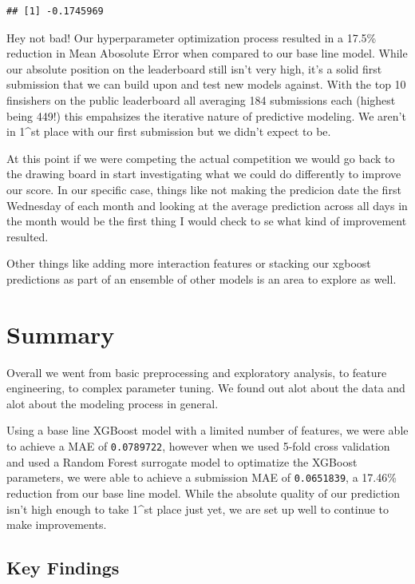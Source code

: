 \documentclass[]{book}
\theoremstyle{definition}
\theoremstyle{definition}
\theoremstyle{definition}
\theoremstyle{remark}
\begin{document}
\begin{verbatim}
## [1] -0.1745969
\end{verbatim}

Hey not bad! Our hyperparameter optimization process resulted in a
17.5\% reduction in Mean Abosolute Error when compared to our base line
model. While our absolute position on the leaderboard still isn't very
high, it's a solid first submission that we can build upon and test new
models against. With the top 10 finsishers on the public leaderboard all
averaging 184 submissions each (highest being 449!) this empahsizes the
iterative nature of predictive modeling. We aren't in 1\^{}st place with
our first submission but we didn't expect to be.

At this point if we were competing the actual competition we would go
back to the drawing board in start investigating what we could do
differently to improve our score. In our specific case, things like not
making the predicion date the first Wednesday of each month and looking
at the average prediction across all days in the month would be the
first thing I would check to se what kind of improvement resulted.

Other things like adding more interaction features or stacking our
xgboost predictions as part of an ensemble of other models is an area to
explore as well.

\chapter{Summary}\label{summary}

Overall we went from basic preprocessing and exploratory analysis, to
feature engineering, to complex parameter tuning. We found out alot
about the data and alot about the modeling process in general.

Using a base line XGBoost model with a limited number of features, we
were able to achieve a MAE of \texttt{0.0789722}, however when we used
5-fold cross validation and used a Random Forest surrogate model to
optimatize the XGBoost parameters, we were able to achieve a submission
MAE of \texttt{0.0651839}, a 17.46\% reduction from our base line model.
While the absolute quality of our prediction isn't high enough to take
1\^{}st place just yet, we are set up well to continue to make
improvements.

\section{Key Findings}\label{key-findings}
\end{document}
